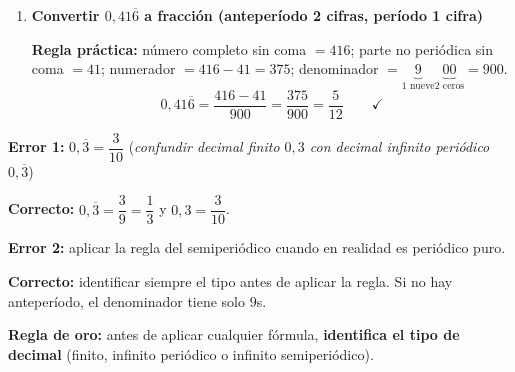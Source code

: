 \documentclass[11pt, letterpaper]{article}
\begin{document}
\begin{tcolorbox}[examplebox, title={Ejemplos --- convertir decimal a fracci\'on}]
\begin{enumerate}[label=\textbf{Ej. \arabic*.}, leftmargin=*, itemsep=16pt]
\textbf{Paso 1 ---} $x = 0{,}1666\ldots$

\textbf{Paso 2 ---} El anteper\'iodo tiene 1 cifra: $10x = 1{,}666\ldots$

\textbf{Paso 3 ---} El per\'iodo tiene 1 cifra: $100x = 16{,}666\ldots$

\textbf{Paso 4 ---} Restamos: $100x - 10x = 16{,}666\ldots - 1{,}666\ldots = 15 \;\Rightarrow\; 90x=15 \;\Rightarrow\; x=\dfrac{15}{90}=\dfrac{1}{6}$.

\textbf{Regla pr\'actica:} n\'umero completo sin coma $= 16$; parte no peri\'odica sin coma $= 1$; numerador $= 16 - 1 = 15$; denominador $= \underbrace{9}_{1\text{ nueve}}\underbrace{0}_{1\text{ cero}} = 90$.
$$0{,}1\overline{6} = \frac{16-1}{90} = \frac{15}{90} = \frac{1}{6} \qquad\checkmark$$

\item \textbf{Convertir $0{,}41\overline{6}$ a fracci\'on (anteper\'iodo 2 cifras, per\'iodo 1 cifra)}

\textbf{Regla pr\'actica:} n\'umero completo sin coma $= 416$; parte no peri\'odica sin coma $= 41$; numerador $= 416 - 41 = 375$; denominador $= \underbrace{9}_{1\text{ nueve}}\underbrace{00}_{2\text{ ceros}} = 900$.
$$0{,}41\overline{6} = \frac{416-41}{900} = \frac{375}{900} = \frac{5}{12} \qquad\checkmark$$

\end{enumerate}
\end{tcolorbox}

\begin{tcolorbox}[warningbox, title={Errores frecuentes --- conversiones de decimal a fracci\'on}]
\noindent\textbf{Error 1:} $0{,}\overline{3} = \dfrac{3}{10}$ \quad (\textit{confundir decimal finito $0{,}3$ con decimal infinito peri\'odico $0{,}\overline{3}$})

\noindent\textbf{Correcto:} $0{,}\overline{3} = \dfrac{3}{9} = \dfrac{1}{3}$ \quad y \quad $0{,}3 = \dfrac{3}{10}$.

\medskip

\noindent\textbf{Error 2:} aplicar la regla del semiperi\'odico cuando en realidad es peri\'odico puro.

\noindent\textbf{Correcto:} identificar siempre el tipo antes de aplicar la regla. Si no hay anteper\'iodo, el denominador tiene solo $9$s.

\medskip

\noindent\textbf{Regla de oro:} antes de aplicar cualquier f\'ormula, \textbf{identifica el tipo de decimal} (finito, infinito peri\'odico o infinito semiperi\'odico).
\end{tcolorbox}
\end{document}
